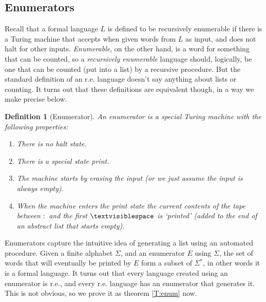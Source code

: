 \documentclass{article}
\theoremstyle{plain}
\newtheorem{definition}[theorem]{Definition}{\bfseries}{\upshape}
\theoremstyle{definition}
\newcommand{\tvs}{\textvisiblespace}
\begin{document}
\subsection{Enumerators}
Recall that a formal language $L$ is defined to be recursively enumerable if there is a Turing machine that accepts when given words from $L$ as input, and does not halt for other inputs. \emph{Enumerable}, on the other hand, is a word for something that can be counted, so a \emph{recursively enumerable} language should, logically, be one that can be counted (put into a list) by a recursive procedure. But the standard definition of an r.e. language doesn't say anything about lists or counting. It turns out that these definitions are equivalent though, in a way we make precise below.

\begin{definition}[Enumerator]
An enumerator is a special Turing machine with the following properties:
\begin{enumerate}
\item There is no halt state.
\item There is a special state \emph{print}.
\item The machine starts by erasing the input (or we just assume the input is always empty).
\item When the machine enters the \emph{print} state the current contents of the tape between $:$ and the first $\tvs$ is `printed' (added to the end of an abstract list that starts empty).
\end{enumerate}
\end{definition}  
Enumerators capture the intuitive idea of generating a list using an automated procedure. Given a finite alphabet $\Sigma$, and an enumerator $E$ using $\Sigma$, the set of words that will eventually be printed by $E$ form a subset of $\Sigma^*$, in other words it is a formal language. It turns out that every language created using an enumerator is r.e., and every r.e. language has an enumerator that generates it. This is not obvious, so we prove it as theorem \ref{T:enum} now.
\end{document}
